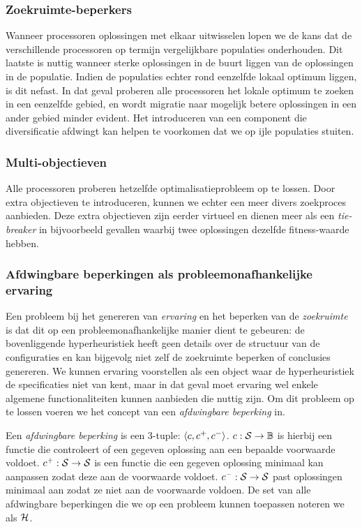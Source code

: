 \subsubsection{Zoekruimte-beperkers}
Wanneer processoren oplossingen met elkaar uitwisselen lopen we de kans dat de verschillende processoren op termijn vergelijkbare populaties onderhouden. Dit laatste is nuttig wanneer sterke oplossingen in de buurt liggen van de oplossingen in de populatie. Indien de populaties echter rond eenzelfde lokaal optimum liggen, is dit nefast. In dat geval proberen alle processoren het lokale optimum te zoeken in een eenzelfde gebied, en wordt migratie naar mogelijk betere oplossingen in een ander gebied minder evident. Het introduceren van een component die diversificatie afdwingt kan helpen te voorkomen dat we op ijle populaties stuiten.

\subsubsection{Multi-objectieven}
Alle processoren proberen hetzelfde optimalisatieprobleem op te lossen. Door extra objectieven te introduceren, kunnen we echter een meer divers zoekproces aanbieden. Deze extra objectieven zijn eerder virtueel en dienen meer als een \emph{tie-breaker} in bijvoorbeeld gevallen waarbij twee oplossingen dezelfde fitness-waarde hebben.

\subsubsection{Afdwingbare beperkingen als probleemonafhankelijke ervaring}

Een probleem bij het genereren van \emph{ervaring} en het beperken van de \emph{zoekruimte} is dat dit op een probleemonafhankelijke manier dient te gebeuren: de bovenliggende hyperheuristiek heeft geen details over de structuur van de configuraties en kan bijgevolg niet zelf de zoekruimte beperken of conclusies genereren. We kunnen ervaring voorstellen als een object waar de hyperheuristiek de specificaties niet van kent, maar in dat geval moet ervaring wel enkele algemene functionaliteiten kunnen aanbieden die nuttig zijn. Om dit probleem op te lossen voeren we het concept van een \emph{afdwingbare beperking} in.

\begin{definition}
Een \emph{afdwingbare beperking} is een 3-tuple: $\left\langle c,c^+,c^-\right\rangle$. $c:\mathcal{S}\rightarrow\mathbb{B}$ is hierbij een functie die controleert of een gegeven oplossing aan een bepaalde voorwaarde voldoet. $c^+:\mathcal{S}\rightarrow\mathcal{S}$ is een functie die een gegeven oplossing minimaal kan aanpassen zodat deze aan de voorwaarde voldoet. $c^-:\mathcal{S}\rightarrow\mathcal{S}$ past oplossingen minimaal aan zodat ze niet aan de voorwaarde voldoen. De set van alle afdwingbare beperkingen die we op een probleem kunnen toepassen noteren we als $\mathcal{H}$.
\end{definition}

